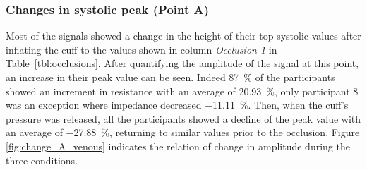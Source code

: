 \subsubsection{Changes in systolic peak (Point A)}
\label{section results 3.1.1}
Most of the signals showed a change in the height of their top systolic values after inflating the cuff to the values shown in column \textit{Occlusion 1} in Table~\ref{tbl:occlusions}. After quantifying the amplitude of the signal at this point, an increase in their peak value can be seen. Indeed \SI{87}{\percent} of the participants showed an increment in resistance with an average of \SI{20.93}{\percent}, only participant 8 was an exception where impedance decreased \SI{-11.11}{\percent}. Then, when the cuff's pressure was released, all the participants showed a decline of the peak value with an average of \SI{-27.88}{\percent}, returning to similar values prior to the occlusion. Figure \ref{fig:change_A_venous} indicates the relation of change in amplitude during the three conditions. 



